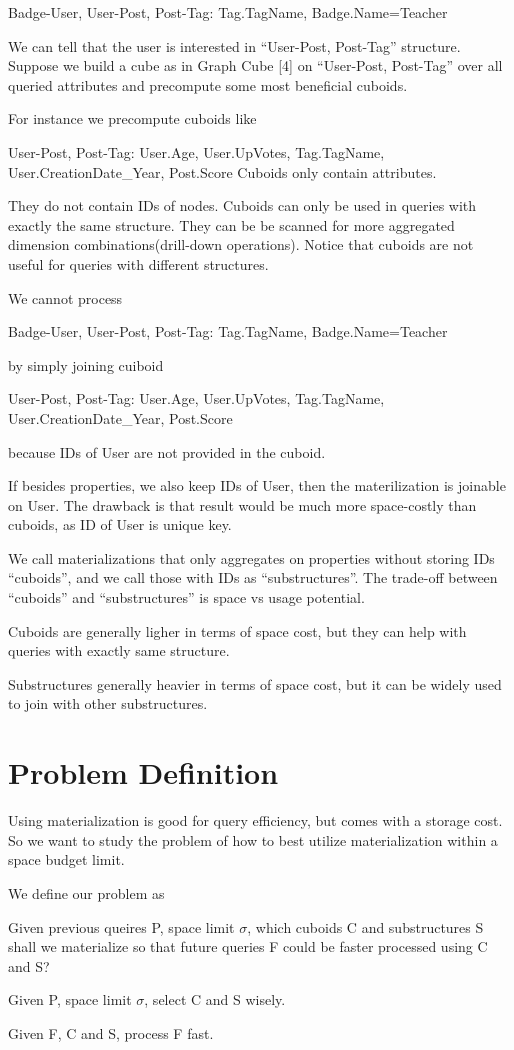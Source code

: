 Badge-User, User-Post, Post-Tag: Tag.TagName, Badge.Name=Teacher

We can tell that the user is interested in “User-Post, Post-Tag” structure. Suppose we build a cube as in Graph Cube [4] on “User-Post, Post-Tag” over all queried attributes and precompute some most beneficial cuboids. 

For instance we precompute cuboids like

User-Post, Post-Tag: User.Age, User.UpVotes, Tag.TagName, User.CreationDate\_Year, Post.Score
Cuboids only contain attributes. 

They do not contain IDs of nodes. Cuboids can only be used in queries with exactly the same structure. They can be be scanned for more aggregated dimension combinations(drill-down operations). Notice that cuboids are not useful for queries with different structures.

We cannot process

Badge-User, User-Post, Post-Tag: Tag.TagName, Badge.Name=Teacher

by simply  joining cuiboid

User-Post, Post-Tag: User.Age, User.UpVotes, Tag.TagName, User.CreationDate\_Year, Post.Score

because IDs of User are not provided in the cuboid.

If besides properties, we also keep IDs of User, then the materilization is joinable on User. The drawback is that result would be much more space-costly than cuboids, as ID of User is unique key. 

We call materializations that only aggregates on properties without storing IDs “cuboids”, and we call those with IDs as “substructures”. The trade-off between “cuboids” and “substructures” is space vs usage potential.

Cuboids are generally ligher in terms of space cost, but they can help with queries with exactly same structure.

Substructures generally heavier in terms of space cost, but it can be widely used to join with other substructures.




\section{Problem Definition}

Using materialization is good for query efficiency, but comes with a storage cost. So we want to study the problem of how to best utilize materialization within a space budget limit. 

We define our problem as

Given previous queires P, space limit $\sigma$, which cuboids C and substructures S shall we materialize so that future queries F could be faster processed using C and S? 

Given P, space limit $\sigma$, select C and S wisely.

Given F, C and S, process F fast.

